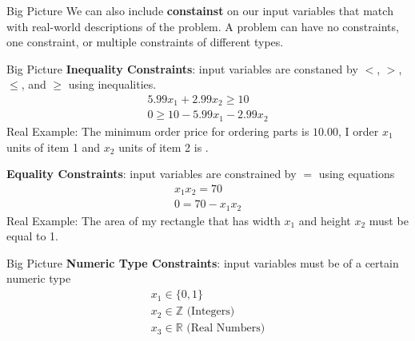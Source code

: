 \documentclass[aspectratio=169]{beamer}
\begin{document}
\begin{frame}{Big Picture}
    We can also include \textbf{constainst} on our input variables that match with real-world descriptions of the problem.
    A problem can have no constraints, one constraint, or multiple constraints of different types.
\end{frame}


\begin{frame}{Big Picture}
    \textbf{Inequality Constraints}: input variables are constaned by $<$, $>$, $\le$, and $\ge$ using inequalities.
    \begin{gather}
        5.99x_1 + 2.99x_2 \ge 10\\
        0 \ge 10 -5.99x_1 - 2.99x_2
    \end{gather}
    Real Example: The minimum order price for ordering parts is $10.00$, I order $x_1$ units of item 1 and $x_2$ units of item 2 is .
    \vspace{\baselineskip}

    \textbf{Equality Constraints}: input variables are constrained by $=$ using equations
    \begin{gather}
        x_1 x_2 = 70\\
        0 = 70 - x_1 x_2
    \end{gather}
    Real Example: The area of my rectangle that has width $x_1$ and height $x_2$ must be equal to 1.
    \vspace{\baselineskip}
\end{frame}

\begin{frame}{Big Picture}
    \textbf{Numeric Type Constraints}: input variables must be of a certain numeric type
    \begin{gather}
        x_1 \in \{0, 1\}\\
        x_2 \in \mathbb{Z}\text{ (Integers)}\\
        x_3 \in \mathbb{R}\text{ (Real Numbers)}
    \end{gather}
    \vspace{\baselineskip}
\end{frame}
\end{document}

